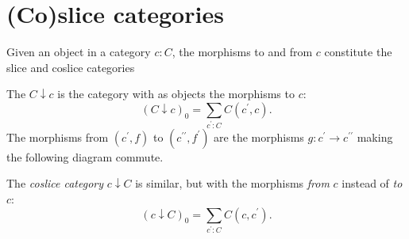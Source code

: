 \section{(Co)slice categories}
Given an object in a category $ c: C $, the morphisms to and from $ c $ constitute the slice and coslice categories
\begin{definition}
  The  $ C \downarrow c $ is the category with as objects the morphisms to $ c $:
  \[ (C \downarrow c)_0 = \sum_{c^\prime: C} C(c^\prime, c). \]
  The morphisms from $ (c^\prime, f) $ to $ (c^{\prime\prime}, f^\prime) $ are the morphisms $ g: c^\prime \to c^{\prime\prime} $ making the following diagram commute.
  \begin{center}
  \end{center}
\end{definition}
The \textit{coslice category} $ c \downarrow C $ is similar, but with the morphisms \textit{from} $ c $ instead of \textit{to} $ c $:
\[ (c \downarrow C)_0 = \sum_{c^\prime: C} C(c, c^\prime). \]

